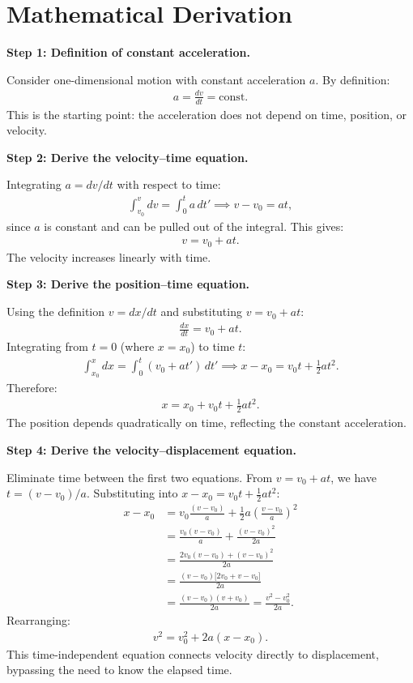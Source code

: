 \section*{Mathematical Derivation}

\textbf{Step 1: Definition of constant acceleration.}

Consider one-dimensional motion with constant acceleration $a$. By definition:
\begin{align}
a = \frac{dv}{dt} = \text{const.}
\end{align}
This is the starting point: the acceleration does not depend on time, position, or velocity.

\textbf{Step 2: Derive the velocity--time equation.}

Integrating $a = dv/dt$ with respect to time:
\begin{align}
\int_{v_0}^{v} dv = \int_0^t a\,dt' \implies v - v_0 = at,
\end{align}
since $a$ is constant and can be pulled out of the integral. This gives:
\begin{align}
\boxed{v = v_0 + at.}
\end{align}
The velocity increases linearly with time.

\textbf{Step 3: Derive the position--time equation.}

Using the definition $v = dx/dt$ and substituting $v = v_0 + at$:
\begin{align}
\frac{dx}{dt} = v_0 + at.
\end{align}
Integrating from $t = 0$ (where $x = x_0$) to time $t$:
\begin{align}
\int_{x_0}^{x} dx = \int_0^t (v_0 + at')\,dt' \implies x - x_0 = v_0 t + \frac{1}{2}at^2.
\end{align}
Therefore:
\begin{align}
\boxed{x = x_0 + v_0 t + \tfrac{1}{2}at^2.}
\end{align}
The position depends quadratically on time, reflecting the constant acceleration.

\textbf{Step 4: Derive the velocity--displacement equation.}

Eliminate time between the first two equations. From $v = v_0 + at$, we have $t = (v - v_0)/a$. Substituting into $x - x_0 = v_0 t + \frac{1}{2}at^2$:
\begin{align}
x - x_0 &= v_0\frac{(v - v_0)}{a} + \frac{1}{2}a\left(\frac{v - v_0}{a}\right)^2 \\
&= \frac{v_0(v - v_0)}{a} + \frac{(v - v_0)^2}{2a} \\
&= \frac{2v_0(v - v_0) + (v - v_0)^2}{2a} \\
&= \frac{(v - v_0)\bigl[2v_0 + v - v_0\bigr]}{2a} \\
&= \frac{(v - v_0)(v + v_0)}{2a} = \frac{v^2 - v_0^2}{2a}.
\end{align}
Rearranging:
\begin{align}
\boxed{v^2 = v_0^2 + 2a(x - x_0).}
\end{align}
This time-independent equation connects velocity directly to displacement, bypassing the need to know the elapsed time.

